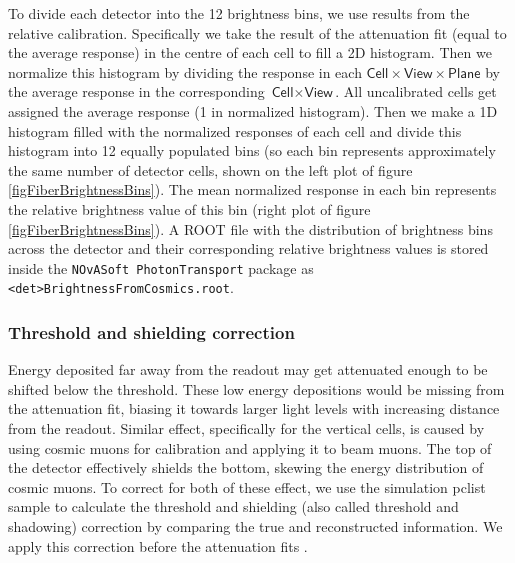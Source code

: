 \documentclass[12pt,a4paper]{article}
\begin{document}
To divide each detector into the 12 brightness bins, we use results from the relative calibration. Specifically we take the result of the attenuation fit (equal to the average response) in the centre of each cell to fill a 2D histogram. Then we normalize this histogram by dividing the response in each $\textsf{Cell}\times\textsf{View}\times\textsf{Plane}$ by the average response in the corresponding $\textsf{Cell}\times\textsf{View}$. All uncalibrated cells get assigned the average response (1 in normalized histogram). Then we make a 1D histogram filled with the normalized responses of each cell and divide this histogram into 12 equally populated bins (so each bin represents approximately the same number of detector cells, shown on the left plot of figure \ref{figFiberBrightnessBins}). The mean normalized response in each bin represents the relative brightness value of this bin (right plot of figure \ref{figFiberBrightnessBins}). A ROOT file with the distribution of brightness bins across the detector and their corresponding relative brightness values is stored inside the \texttt{NOvASoft PhotonTransport} package as \texttt{<det>BrightnessFromCosmics.root}.

\subsubsection*{Threshold and shielding correction}

Energy deposited far away from the readout may get attenuated enough to be shifted below the threshold. These low energy depositions would be missing from the attenuation fit, biasing it towards larger light levels with increasing distance from the readout. Similar effect, specifically for the vertical cells, is caused by using cosmic muons for calibration and applying it to beam muons. The top of the detector effectively shields the bottom, skewing the energy distribution of cosmic muons. To correct for both of these effect, we use the simulation pclist sample to calculate the threshold and shielding (also called threshold and shadowing) correction by comparing the true and reconstructed information. We apply this correction before the attenuation fits \cite{NOVA-doc-13579-SAAttenuationAndThreshold}.

\end{document}
